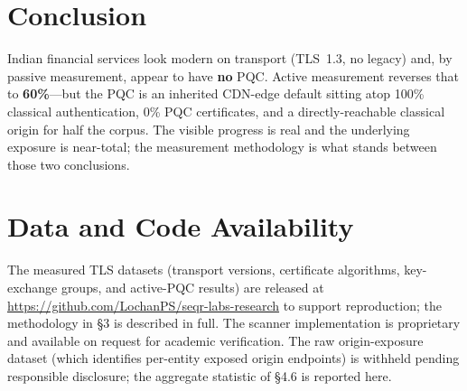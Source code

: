 \documentclass[11pt]{article}
\begin{document}
\section{Conclusion}

Indian financial services look modern on transport (TLS~1.3, no legacy) and, by passive
measurement, appear to have \textbf{no} PQC. Active measurement reverses that to \textbf{60\%}---but
the PQC is an inherited CDN-edge default sitting atop 100\% classical authentication, 0\% PQC
certificates, and a directly-reachable classical origin for half the corpus. The visible progress
is real and the underlying exposure is near-total; the measurement methodology is what stands
between those two conclusions.

\section*{Data and Code Availability}

The measured TLS datasets (transport versions, certificate algorithms, key-exchange groups, and
active-PQC results) are released at \url{https://github.com/LochanPS/seqr-labs-research} to support
reproduction; the methodology in \S3 is described in full. The scanner implementation is
proprietary and available on request for academic verification. The raw origin-exposure dataset
(which identifies per-entity exposed origin endpoints) is withheld pending responsible disclosure;
the aggregate statistic of \S4.6 is reported here.
\end{document}
